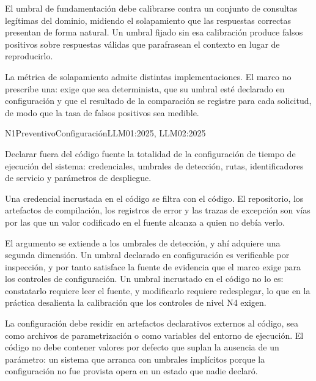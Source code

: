 El umbral de fundamentación debe calibrarse contra un conjunto de consultas legítimas del dominio, midiendo el solapamiento que las respuestas correctas presentan de forma natural. Un umbral fijado sin esa calibración produce falsos positivos sobre respuestas válidas que parafrasean el contexto en lugar de reproducirlo.

La métrica de solapamiento admite distintas implementaciones. El marco no prescribe una: exige que sea determinista, que su umbral esté declarado en configuración y que el resultado de la comparación se registre para cada solicitud, de modo que la tasa de falsos positivos sea medible.


  {N1}{Preventivo}{Configuración}{LLM01:2025, LLM02:2025}

Declarar fuera del código fuente la totalidad de la configuración de tiempo de ejecución del sistema: credenciales, umbrales de detección, rutas, identificadores de servicio y parámetros de despliegue.

Una credencial incrustada en el código se filtra con el código. El repositorio, los artefactos de compilación, los registros de error y las trazas de excepción son vías por las que un valor codificado en el fuente alcanza a quien no debía verlo.

El argumento se extiende a los umbrales de detección, y ahí adquiere una segunda dimensión. Un umbral declarado en configuración es verificable por inspección, y por tanto satisface la fuente de evidencia que el marco exige para los controles de configuración. Un umbral incrustado en el código no lo es: constatarlo requiere leer el fuente, y modificarlo requiere redesplegar, lo que en la práctica desalienta la calibración que los controles de nivel N4 exigen.

La configuración debe residir en artefactos declarativos externos al código, sea como archivos de parametrización o como variables del entorno de ejecución. El código no debe contener valores por defecto que suplan la ausencia de un parámetro: un sistema que arranca con umbrales implícitos porque la configuración no fue provista opera en un estado que nadie declaró.

